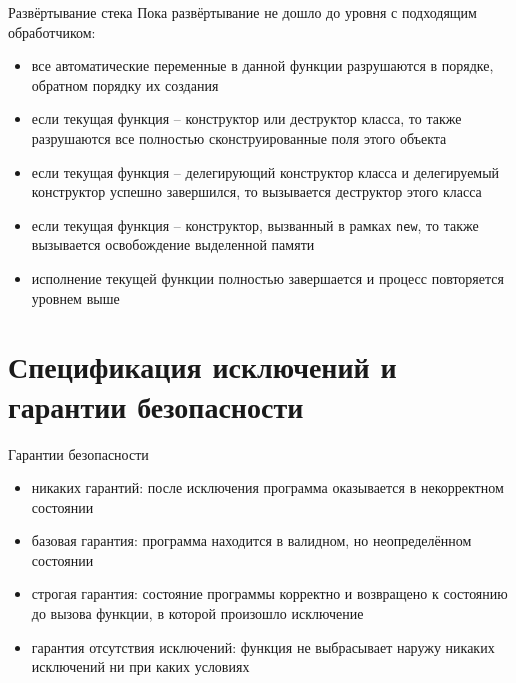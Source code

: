 \documentclass[unknownkeysallowed,xcolor=table]{beamer}
\begin{document}
\begin{frame}{Развёртывание стека}
  Пока развёртывание не дошло до уровня с подходящим обработчиком:
  \begin{itemize}
    \item все автоматические переменные в данной функции разрушаются в порядке, обратном порядку их создания \vspace{1em}
    \item если текущая функция -- конструктор или деструктор класса, то также разрушаются все полностью сконструированные поля этого объекта \vspace{1em}
    \item если текущая функция -- делегирующий конструктор класса и делегируемый конструктор успешно завершился, то вызывается деструктор этого класса \vspace{1em}
    \item если текущая функция -- конструктор, вызванный в рамках \lstinline{new}, то также вызывается освобождение выделенной памяти \vspace{1em}
    \item исполнение текущей функции полностью завершается и процесс повторяется уровнем выше
  \end{itemize}
\end{frame}

\section{Спецификация исключений и гарантии безопасности}

\begin{frame}{Гарантии безопасности}
  \begin{itemize}
    \item никаких гарантий: после исключения программа оказывается в некорректном состоянии \vspace{1em}
    \item базовая гарантия: программа находится в валидном, но неопределённом состоянии \vspace{1em}
    \item строгая гарантия: состояние программы корректно и возвращено к состоянию до вызова функции, в которой произошло исключение \vspace{1em}
    \item гарантия отсутствия исключений: функция не выбрасывает наружу никаких исключений ни при каких условиях
  \end{itemize}
\end{frame}
\end{document}

